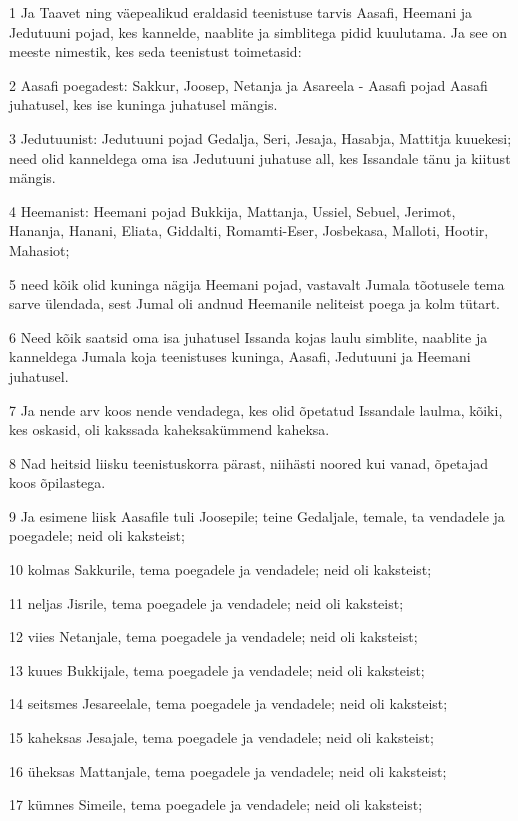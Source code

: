 \par 1 Ja Taavet ning väepealikud eraldasid teenistuse tarvis Aasafi, Heemani ja Jedutuuni pojad, kes kannelde, naablite ja simblitega pidid kuulutama. Ja see on meeste nimestik, kes seda teenistust toimetasid:
\par 2 Aasafi poegadest: Sakkur, Joosep, Netanja ja Asareela - Aasafi pojad Aasafi juhatusel, kes ise kuninga juhatusel mängis.
\par 3 Jedutuunist: Jedutuuni pojad Gedalja, Seri, Jesaja, Hasabja, Mattitja kuuekesi; need olid kanneldega oma isa Jedutuuni juhatuse all, kes Issandale tänu ja kiitust mängis.
\par 4 Heemanist: Heemani pojad Bukkija, Mattanja, Ussiel, Sebuel, Jerimot, Hananja, Hanani, Eliata, Giddalti, Romamti-Eser, Josbekasa, Malloti, Hootir, Mahasiot;
\par 5 need kõik olid kuninga nägija Heemani pojad, vastavalt Jumala tõotusele tema sarve ülendada, sest Jumal oli andnud Heemanile neliteist poega ja kolm tütart.
\par 6 Need kõik saatsid oma isa juhatusel Issanda kojas laulu simblite, naablite ja kanneldega Jumala koja teenistuses kuninga, Aasafi, Jedutuuni ja Heemani juhatusel.
\par 7 Ja nende arv koos nende vendadega, kes olid õpetatud Issandale laulma, kõiki, kes oskasid, oli kakssada kaheksakümmend kaheksa.
\par 8 Nad heitsid liisku teenistuskorra pärast, niihästi noored kui vanad, õpetajad koos õpilastega.
\par 9 Ja esimene liisk Aasafile tuli Joosepile; teine Gedaljale, temale, ta vendadele ja poegadele; neid oli kaksteist;
\par 10 kolmas Sakkurile, tema poegadele ja vendadele; neid oli kaksteist;
\par 11 neljas Jisrile, tema poegadele ja vendadele; neid oli kaksteist;
\par 12 viies Netanjale, tema poegadele ja vendadele; neid oli kaksteist;
\par 13 kuues Bukkijale, tema poegadele ja vendadele; neid oli kaksteist;
\par 14 seitsmes Jesareelale, tema poegadele ja vendadele; neid oli kaksteist;
\par 15 kaheksas Jesajale, tema poegadele ja vendadele; neid oli kaksteist;
\par 16 üheksas Mattanjale, tema poegadele ja vendadele; neid oli kaksteist;
\par 17 kümnes Simeile, tema poegadele ja vendadele; neid oli kaksteist;
